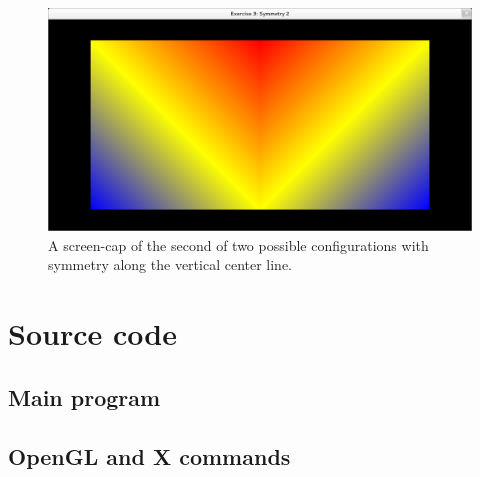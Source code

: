 \documentclass[a4paper, english, 12pt]{article}
\begin{document}
\begin{figure}[p]
\centering
\includegraphics[width=\textwidth]{figures/symmetry-2.png}
\caption{A screen-cap of the second of two possible configurations with symmetry along the vertical center line.}
\label{fig:symmetry-2}
\end{figure}


\pagebreak
{}



\pagebreak
\appendix
\section{Source code}
\label{sec:app_source}

\subsection{Main program}
\label{sub:source_main}


\subsection{OpenGL and X commands}
\label{sub:source_gl}


\end{document}
